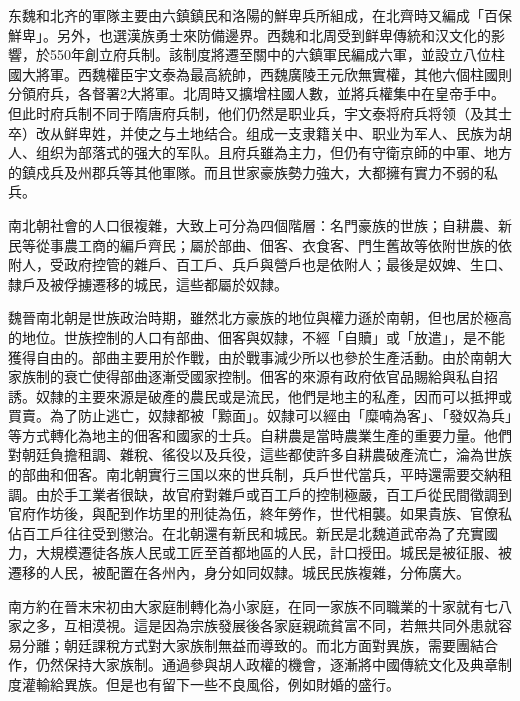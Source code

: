东魏和北齐的軍隊主要由六鎮鎮民和洛陽的鮮卑兵所組成，在北齊時又編成「百保鮮卑」。另外，也選漢族勇士來防備邊界。西魏和北周受到鲜卑傳統和汉文化的影響，於550年創立府兵制。該制度將遷至關中的六鎮軍民編成六軍，並設立八位柱國大將軍。西魏權臣宇文泰為最高統帥，西魏廣陵王元欣無實權，其他六個柱國則分領府兵，各督署2大將軍。北周時又擴增柱國人數，並將兵權集中在皇帝手中。但此时府兵制不同于隋唐府兵制，他们仍然是职业兵，宇文泰将府兵将领（及其士卒）改从鲜卑姓，并使之与土地结合。组成一支隶籍关中、职业为军人、民族为胡人、组织为部落式的强大的军队。且府兵雖為主力，但仍有守衛京師的中軍、地方的鎮戍兵及州郡兵等其他軍隊。而且世家豪族勢力強大，大都擁有實力不弱的私兵。

南北朝社會的人口很複雜，大致上可分為四個階層：名門豪族的世族；自耕農、新民等從事農工商的編戶齊民；屬於部曲、佃客、衣食客、門生舊故等依附世族的依附人，受政府控管的雜戶、百工戶、兵戶與營戶也是依附人；最後是奴婢、生口、隸戶及被俘擄遷移的城民，這些都屬於奴隸。

魏晉南北朝是世族政治時期，雖然北方豪族的地位與權力遜於南朝，但也居於極高的地位。世族控制的人口有部曲、佃客與奴隸，不經「自贖」或「放遣」，是不能獲得自由的。部曲主要用於作戰，由於戰事減少所以也參於生產活動。由於南朝大家族制的衰亡使得部曲逐漸受國家控制。佃客的來源有政府依官品賜給與私自招誘。奴隸的主要來源是破產的農民或是流民，他們是地主的私產，因而可以抵押或買賣。為了防止逃亡，奴隸都被「黥面」。奴隸可以經由「糜喃為客」、「發奴為兵」等方式轉化為地主的佃客和國家的士兵。自耕農是當時農業生產的重要力量。他們對朝廷負擔租調、雜稅、徭役以及兵役，這些都使許多自耕農破產流亡，淪為世族的部曲和佃客。南北朝實行三国以來的世兵制，兵戶世代當兵，平時還需要交納租調。由於手工業者很缺，故官府對雜戶或百工戶的控制極嚴，百工戶從民間徵調到官府作坊後，與配到作坊里的刑徒為伍，終年勞作，世代相襲。如果貴族、官僚私佔百工戶往往受到懲治。在北朝還有新民和城民。新民是北魏道武帝為了充實國力，大規模遷徒各族人民或工匠至首都地區的人民，計口授田。城民是被征服、被遷移的人民，被配置在各州內，身分如同奴隸。城民民族複雜，分佈廣大。

南方約在晉末宋初由大家庭制轉化為小家庭，在同一家族不同職業的十家就有七八家之多，互相漠視。這是因為宗族發展後各家庭親疏貧富不同，若無共同外患就容易分離；朝廷課稅方式對大家族制無益而導致的。而北方面對異族，需要團結合作，仍然保持大家族制。通過參與胡人政權的機會，逐漸將中國傳統文化及典章制度灌輸給異族。但是也有留下一些不良風俗，例如財婚的盛行。

